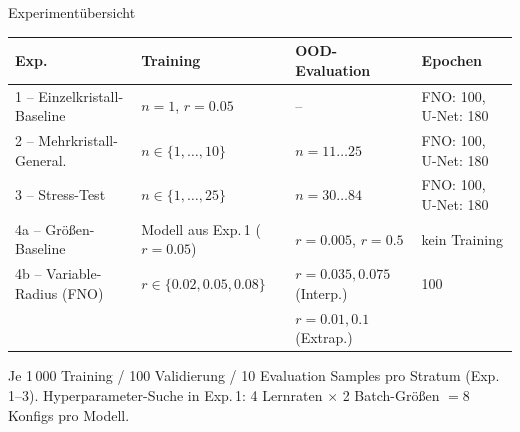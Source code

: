 \documentclass[aspectratio=169, 10pt]{beamer}
\begin{document}
\begin{frame}{Experimentübersicht}
\begin{table}
\small
\begin{tabular}{llll}
\toprule
\textbf{Exp.} & \textbf{Training} & \textbf{OOD-Evaluation} & \textbf{Epochen} \\
\midrule
1 – Einzelkristall-Baseline    & $n=1$, $r=0.05$                  & --                       & FNO: 100, U-Net: 180 \\
2 – Mehrkristall-General.      & $n\in\{1,\ldots,10\}$            & $n=11\ldots25$           & FNO: 100, U-Net: 180 \\
3 – Stress-Test                & $n\in\{1,\ldots,25\}$            & $n=30\ldots84$           & FNO: 100, U-Net: 180 \\
4a – Größen-Baseline           & Modell aus Exp.\,1 ($r=0.05$)   & $r=0.005$, $r=0.5$       & kein Training \\
4b – Variable-Radius (FNO)     & $r\in\{0.02, 0.05, 0.08\}$      & $r=0.035, 0.075$ (Interp.)& 100 \\
                               &                                  & $r=0.01, 0.1$ (Extrap.)  &     \\
\bottomrule
\end{tabular}
\end{table}
\vspace{4pt}
Je 1\,000 Training / 100 Validierung / 10 Evaluation Samples pro Stratum (Exp.\,1–3).
Hyperparameter-Suche in Exp.\,1: 4 Lernraten $\times$ 2 Batch-Größen $= 8$ Konfigs pro Modell.
\end{frame}
\end{document}
